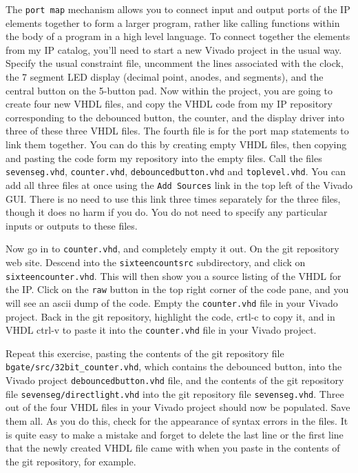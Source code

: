 \documentclass[../physical_computing.tex]{subfiles}
\begin{document}
The \texttt{port map} mechanism allows you to connect input and output ports of the IP elements together to form a larger program, rather like calling functions within the body of a program in a high level language. To connect together the elements from my IP catalog, you'll need to start a new Vivado project in the usual way. Specify the usual constraint file, uncomment the lines associated with the clock, the 7 segment LED display (decimal point, anodes, and segments), and the central button on the 5-button pad. Now within the project, you are going to create four new VHDL files, and copy the VHDL code from my IP repository corresponding to the debounced button, the counter, and the display driver into three of these three VHDL files. The fourth file is for the port map statements to link them together. You can do this by creating empty VHDL files, then copying and pasting the code form my repository into the empty files. Call the files \texttt{sevenseg.vhd}, \texttt{counter.vhd}, \texttt{debouncedbutton.vhd} and \texttt{toplevel.vhd}. You can add all three files at once using the \texttt{Add Sources} link in the top left of the Vivado GUI. There is no need to use this link three times separately for the three files, though it does no harm if you do. You do not need to specify any particular inputs or outputs to these files.

Now go in to \texttt{counter.vhd}, and completely empty it out. On the git repository web site. Descend into the \texttt{sixteencount\/src} subdirectory, and click on \texttt{sixteencounter.vhd}. This will then show you a source listing of the VHDL for the IP. Click on the \texttt{raw} button in the top right corner of the code pane, and you will see an ascii dump of the code. Empty the \texttt{counter.vhd} file in your Vivado project. Back in the git repository, highlight the code, crtl-c to copy it, and in VHDL ctrl-v to paste it into the \texttt{counter.vhd} file in your Vivado project. 

Repeat this exercise, pasting the contents of the git repository file \\
\texttt{bgate/src/32bit\_counter.vhd}, which contains the debounced button, into the Vivado project \texttt{debouncedbutton.vhd} file, and the contents of the git repository file 
\texttt{sevenseg/directlight.vhd} into the git repository file \texttt{sevenseg.vhd}. Three out of the four VHDL files in your Vivado project should now be populated. Save them all. As you do this, check for the appearance of syntax errors in the files. It is quite easy to make a mistake and forget to delete the last line or the first line that the newly created VHDL file came with when you paste in the contents of the git repository, for example. 
\end{document}
